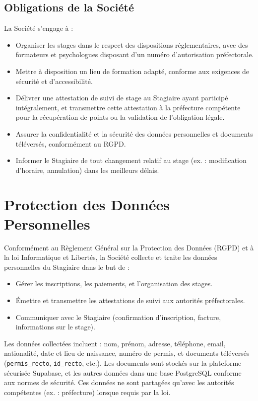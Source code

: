\documentclass[a4paper,12pt]{article}
\begin{document}
\subsection{Obligations de la Société}
La Société s'engage à :
\begin{itemize}
    \item Organiser les stages dans le respect des dispositions réglementaires, avec des formateurs et psychologues disposant d'un numéro d'autorisation préfectorale.
    \item Mettre à disposition un lieu de formation adapté, conforme aux exigences de sécurité et d'accessibilité.
    \item Délivrer une attestation de suivi de stage au Stagiaire ayant participé intégralement, et transmettre cette attestation à la préfecture compétente pour la récupération de points ou la validation de l'obligation légale.
    \item Assurer la confidentialité et la sécurité des données personnelles et documents téléversés, conformément au RGPD.
    \item Informer le Stagiaire de tout changement relatif au stage (ex. : modification d'horaire, annulation) dans les meilleurs délais.
\end{itemize}

\section{Protection des Données Personnelles}
Conformément au Règlement Général sur la Protection des Données (RGPD) et à la loi Informatique et Libertés, la Société collecte et traite les données personnelles du Stagiaire dans le but de :
\begin{itemize}
    \item Gérer les inscriptions, les paiements, et l'organisation des stages.
    \item Émettre et transmettre les attestations de suivi aux autorités préfectorales.
    \item Communiquer avec le Stagiaire (confirmation d'inscription, facture, informations sur le stage).
\end{itemize}

Les données collectées incluent : nom, prénom, adresse, téléphone, email, nationalité, date et lieu de naissance, numéro de permis, et documents téléversés (\texttt{permis\_recto}, \texttt{id\_recto}, etc.). Les documents sont stockés sur la plateforme sécurisée Supabase, et les autres données dans une base PostgreSQL conforme aux normes de sécurité. Ces données ne sont partagées qu'avec les autorités compétentes (ex. : préfecture) lorsque requis par la loi.
\end{document}
